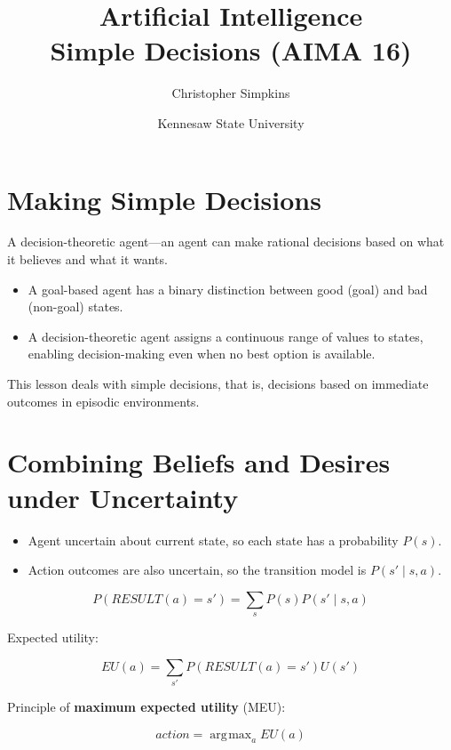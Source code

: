 \documentclass[11pt]{article}
\author{Christopher Simpkins}
\date{Kennesaw State University}
\title{Artificial Intelligence\\\medskip
\large Simple Decisions (AIMA 16)}
\DeclareMathOperator*{\argmax}{arg\!max}
\begin{document}
\maketitle
\section{Making Simple Decisions}
\label{sec:org79a1691}

A decision-theoretic agent—an agent can make rational decisions based on what it believes and what it wants.

\begin{itemize}
\item A goal-based agent has a binary distinction between good (goal) and bad (non-goal) states.

\item A decision-theoretic agent assigns a continuous range of values to states, enabling decision-making even when no best option is available.
\end{itemize}

This lesson deals with simple decisions, that is, decisions based on immediate outcomes in episodic environments.
\section{Combining Beliefs and Desires under Uncertainty}
\label{sec:orgf59ed55}

\begin{itemize}
\item Agent uncertain about current state, so each state has a probability \(P(s)\).

\item Action outcomes are also uncertain, so the transition model is \(P(s' \mid s, a)\).
\end{itemize}

\begin{equation*}
P(RESULT(a) = s') = \sum_s P(s) P(s' \mid s, a)
\end{equation*}

Expected utility:

\begin{equation*}
EU(a) = \sum_{s'} P(RESULT(a) = s') U(s') \tag{16.1}
\end{equation*}

Principle of \textbf{maximum expected utility} (MEU):

\begin{equation*}
action = \argmax_a EU(a)
\end{equation*}
\end{document}
